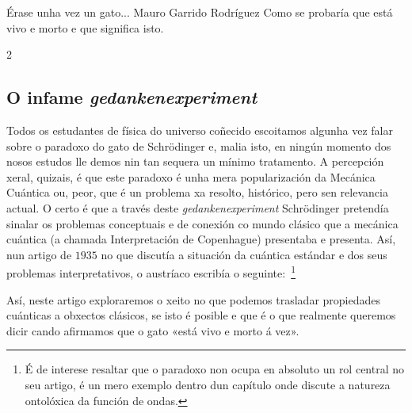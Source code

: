 \Artigo*%
{filosofia}%
{Érase unha vez un gato...}%
{Mauro Garrido Rodríguez}%
{Como se probaría que está vivo e morto e que significa isto.}%

\begin{multicols}{2}

\subsection*{O infame \textit{gedankenexperiment}}

Todos os estudantes de física do universo coñecido escoitamos algunha vez falar
sobre o paradoxo do gato de Schrödinger e, malia isto, en ningún momento dos
nosos estudos lle demos nin tan sequera un mínimo tratamento. A percepción
xeral, quizais, é que este paradoxo é unha mera popularización da Mecánica
Cuántica ou, peor, que é un problema xa resolto, histórico, pero sen relevancia
actual. O certo é que a través deste \textit{gedankenexperiment} Schrödinger
pretendía sinalar os problemas conceptuais e de conexión co mundo clásico que a
mecánica cuántica (a chamada Interpretación de Copenhague) presentaba e
presenta. Así, nun artigo de $1935$ \cite{schrodinger1} no que discutía a
situación da cuántica estándar e dos seus problemas interpretativos, o
austríaco escribía o seguinte:~\footnote{É de interese resaltar que o paradoxo
non ocupa en absoluto un rol central no seu artigo, é un mero exemplo dentro
dun capítulo onde discute a natureza ontolóxica da función de ondas.}


Así, neste artigo exploraremos o xeito no que podemos trasladar propiedades
cuánticas a obxectos clásicos, se isto é posible e que é o que realmente
queremos dicir cando afirmamos que o gato «está vivo e morto á vez».


\end{multicols}
